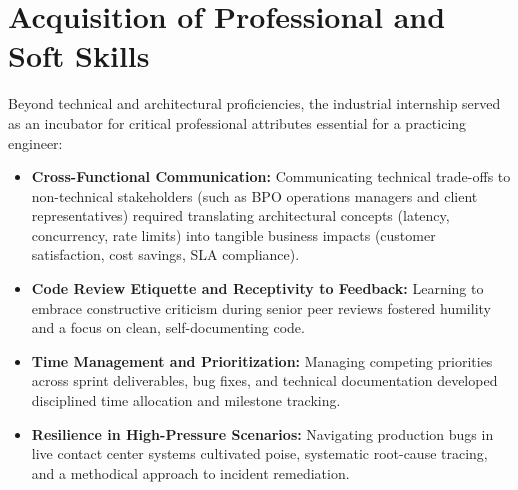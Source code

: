 \section{Acquisition of Professional and Soft Skills}
\label{sec:exp_soft_skills}

Beyond technical and architectural proficiencies, the industrial internship served as an incubator for critical professional attributes essential for a practicing engineer:

\begin{itemize}
    \item \textbf{Cross-Functional Communication:} Communicating technical trade-offs to non-technical stakeholders (such as BPO operations managers and client representatives) required translating architectural concepts (latency, concurrency, rate limits) into tangible business impacts (customer satisfaction, cost savings, SLA compliance).
    \item \textbf{Code Review Etiquette and Receptivity to Feedback:} Learning to embrace constructive criticism during senior peer reviews fostered humility and a focus on clean, self-documenting code.
    \item \textbf{Time Management and Prioritization:} Managing competing priorities across sprint deliverables, bug fixes, and technical documentation developed disciplined time allocation and milestone tracking.
    \item \textbf{Resilience in High-Pressure Scenarios:} Navigating production bugs in live contact center systems cultivated poise, systematic root-cause tracing, and a methodical approach to incident remediation.
\end{itemize}
